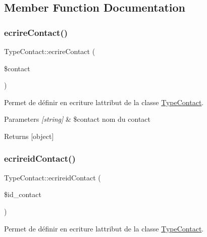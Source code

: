 \subsection{Member Function Documentation}
\mbox{\label{class_type_contact_ae88b186082363707fcb738cc9ba39dbf}} 
\subsubsection{\texorpdfstring{ecrire\+Contact()}{ecrireContact()}}
{\footnotesize\ttfamily Type\+Contact\+::ecrire\+Contact (\begin{DoxyParamCaption}\item[{}]{\$contact }\end{DoxyParamCaption})}



Permet de définir en ecriture l\textquotesingle{}attribut de la classe \hyperlink{class_type_contact}{Type\+Contact}. 


\begin{DoxyParams}{Parameters}
{\em \mbox{[}string\mbox{]}} & \$contact nom du contact \\
\hline
\end{DoxyParams}
\begin{DoxyReturn}{Returns}
\mbox{[}object\mbox{]} 
\end{DoxyReturn}
\mbox{\label{class_type_contact_acdd6e6bff6fc01769d970ca7bc33be1f}} 
\subsubsection{\texorpdfstring{ecrireid\+Contact()}{ecrireidContact()}}
{\footnotesize\ttfamily Type\+Contact\+::ecrireid\+Contact (\begin{DoxyParamCaption}\item[{}]{\$id\+\_\+contact }\end{DoxyParamCaption})}



Permet de définir en ecriture l\textquotesingle{}attribut de la classe \hyperlink{class_type_contact}{Type\+Contact}. 


